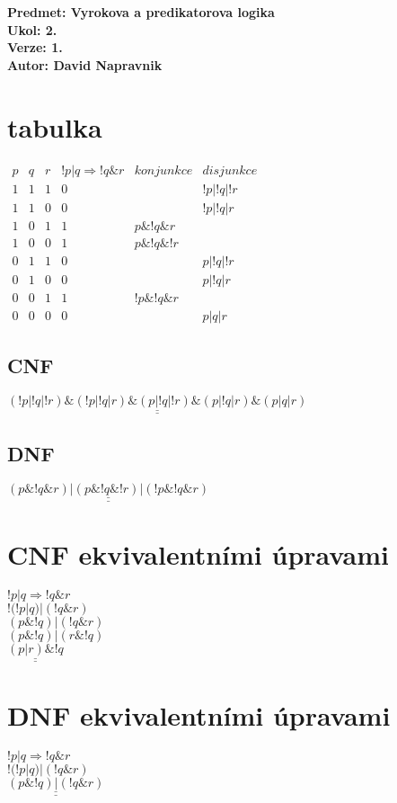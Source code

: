 \documentclass[a4paper]{article}
\def\doubleunderline#1{\underline{\underline{#1}}}
\begin{document}
\noindent
\textbf{Predmet: Vyrokova a predikatorova logika}\\
\textbf{Ukol: 2.}\\
\textbf{Verze: 1.}\\
\textbf{Autor: David Napravnik}

\section*{tabulka}
$
\begin{matrix}
	p & q & r & !p|q \Rightarrow !q \& r & konjunkce & disjunkce\\
	1&	1&	1&	0&			&	!p|!q|!r\\
	1&	1&	0&	0&			&	!p|!q|r	\\
	1&	0&	1&	1&	p\&!q\&r	&			\\
	1&	0&	0&	1&	p\&!q\&!r	&			\\
	0&	1&	1&	0&			&	p|!q|!r	\\
	0&	1&	0&	0&			&	p|!q|r	\\
	0&	0&	1&	1&	!p\&!q\&r	&			\\
	0&	0&	0&	0&			&	p|q|r
\end{matrix}
$

\subsection*{CNF}
$\doubleunderline{
	(!p|!q|!r)\&(!p|!q|r)\&(p|!q|!r)\&(p|!q|r)\&(p|q|r)
}$


\subsection*{DNF}
$\doubleunderline{
	(p\&!q\&r)|(p\&!q\&!r)|(!p\&!q\&r)
}$


\section*{CNF ekvivalentními úpravami}
$!p|q \Rightarrow !q \& r$\\
$!(!p|q) | (!q \& r)$\\
$(p \& !q) | (!q \& r)$\\
$(p \& !q) | (r \& !q)$\\
$\doubleunderline{
	(p | r) \& !q
}$\\


\section*{DNF ekvivalentními úpravami}
$!p|q \Rightarrow !q \& r$\\
$!(!p|q) | (!q \& r)$\\
$\doubleunderline{
	(p \& !q) | (!q \& r)
}$\\
\end{document}
